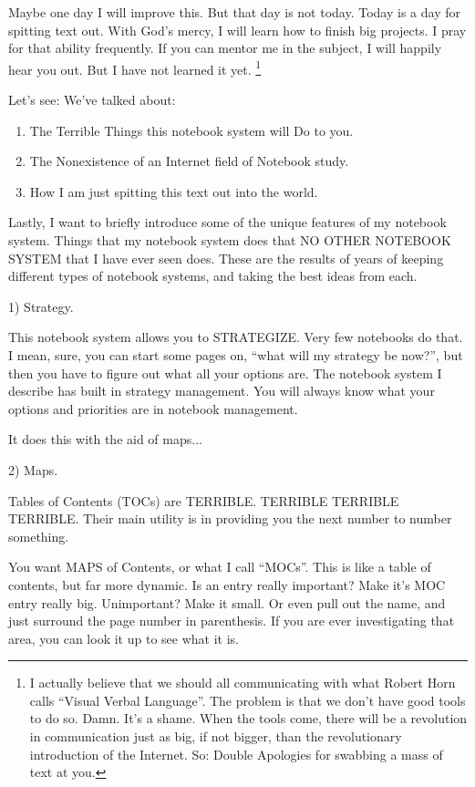 \documentclass[oneside]{book}
\begin{document}
Maybe one day I will improve this. But that day is not today. Today is
a day for spitting text out. With God's mercy, I will learn how to
finish big projects. I pray for that ability frequently. If you can
mentor me in the subject, I will happily hear you out. But I have not
learned it yet.
\footnote{I actually believe that we should all communicating with
what Robert Horn calls ``Visual Verbal Language''. The problem is that
we don't have good tools to do so. Damn. It's a shame. When the tools
come, there will be a revolution in communication just as big, if not
bigger, than the revolutionary introduction of the Internet. So:
Double Apologies for swabbing a mass of text at you.}

Let's see: We've talked about:
\begin{enumerate}
\item The Terrible Things this notebook system will Do to you.
\item The Nonexistence of an Internet field of Notebook study.
\item How I am just spitting this text out into the world.
\end{enumerate}

Lastly, I want to briefly introduce some of the unique features of my
notebook system. Things that my notebook system does that NO OTHER
NOTEBOOK SYSTEM that I have ever seen does. These are the results of
years of keeping different types of notebook systems, and taking the
best ideas from each.

1) Strategy.

This notebook system allows you to STRATEGIZE. Very few notebooks do
that. I mean, sure, you can start some pages on, ``what will my
strategy be now?'', but then you have to figure out what all your
options are. The notebook system I describe has built in strategy
management. You will always know what your options and priorities are
in notebook management.

It does this with the aid of maps...

2) Maps.

Tables of Contents (TOCs) are TERRIBLE. TERRIBLE TERRIBLE
TERRIBLE. Their main utility is in providing you the next number to
number something.

You want MAPS of Contents, or what I call ``MOCs''. This is like a table
of contents, but far more dynamic. Is an entry really important? Make
it's MOC entry really big. Unimportant? Make it small. Or even pull
out the name, and just surround the page number in parenthesis. If you
are ever investigating that area, you can look it up to see what it
is.
\end{document}
